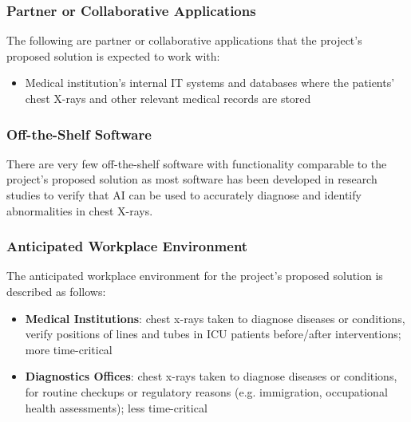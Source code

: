 \documentclass[12pt]{article}
\begin{document}
\subsubsection{Partner or Collaborative Applications}
The following are partner or collaborative applications that the project’s proposed solution is expected to work with:
\begin{itemize}
    \item Medical institution’s internal IT systems and databases where the patients’ chest X-rays and other relevant medical records are stored
\end{itemize}

\subsubsection{Off-the-Shelf Software}
There are very few off-the-shelf software with functionality comparable to the project’s proposed solution as most software has been developed in research studies to verify that AI can be used to accurately diagnose and identify abnormalities in chest X-rays. 

\subsubsection{Anticipated Workplace Environment}
The anticipated workplace environment for the project’s proposed solution is described as follows:
\begin{itemize}
    \item \textbf{Medical Institutions}: chest x-rays taken to diagnose diseases or conditions, verify positions of lines and tubes in ICU patients before/after interventions; more time-critical
    \item \textbf{Diagnostics Offices}: chest x-rays taken to diagnose diseases or conditions, for routine checkups or regulatory reasons (e.g. immigration, occupational health assessments); less time-critical
\end{itemize}
\end{document}
